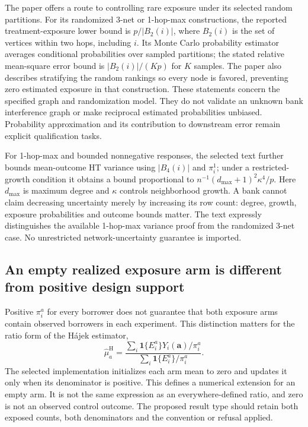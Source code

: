 The paper offers a route to controlling rare exposure under its selected random partitions. For its randomized 3-net or 1-hop-max constructions, the reported treatment-exposure lower bound is $p/|B_2(i)|$, where $B_2(i)$ is the set of vertices within two hops, including $i$. Its Monte Carlo probability estimator averages conditional probabilities over sampled partitions; the stated relative mean-square error bound is $|B_2(i)|/(Kp)$ for $K$ samples. The paper also describes stratifying the random rankings so every node is favored, preventing zero estimated exposure in that construction. These statements concern the specified graph and randomization model. They do not validate an unknown bank interference graph or make reciprocal estimated probabilities unbiased. Probability approximation and its contribution to downstream error remain explicit qualification tasks.~\citep{exec25_cnet_paper,exec25_cnet_choice}

For 1-hop-max and bounded nonnegative responses, the selected text further bounds mean-outcome HT variance using $|B_4(i)|$ and $\pi_i^1$; under a restricted-growth condition it obtains a bound proportional to $n^{-1}(d_{\max}+1)^2\kappa^4/p$. Here $d_{\max}$ is maximum degree and $\kappa$ controls neighborhood growth. A bank cannot claim decreasing uncertainty merely by increasing its row count: degree, growth, exposure probabilities and outcome bounds matter. The text expressly distinguishes the available 1-hop-max variance proof from the randomized 3-net case. No unrestricted network-uncertainty guarantee is imported.~\citep{exec25_cnet_paper}

\subsection{An empty realized exposure arm is different from positive design support}

Positive $\pi_i^a$ for every borrower does not guarantee that both exposure arms contain observed borrowers in each experiment. This distinction matters for the ratio form of the H\'ajek estimator,
\[
 \widehat\mu_a^{\mathrm{H}}=
 \frac{\sum_i\mathbf{1}\{E_i^a\}Y_i(\mathbf a)/\pi_i^a}
      {\sum_i\mathbf{1}\{E_i^a\}/\pi_i^a}.
\]
The selected implementation initializes each arm mean to zero and updates it only when its denominator is positive. This defines a numerical extension for an empty arm. It is not the same expression as an everywhere-defined ratio, and zero is not an observed control outcome. The proposed result type should retain both exposed counts, both denominators and the convention or refusal applied.~\citep{exec25_cnet_rgcr,exec25_cnet_choice}

